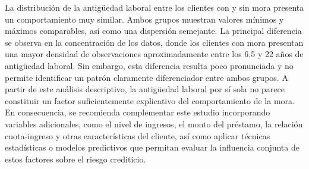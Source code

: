 La distribución de la antigüedad laboral entre los clientes con y sin mora presenta un comportamiento muy similar. Ambos grupos muestran valores mínimos y máximos comparables, así como una dispersión semejante. La principal diferencia se observa en la concentración de los datos, donde los clientes con mora presentan una mayor densidad de observaciones aproximadamente entre los
6.5 y 22 años
de antigüedad laboral. Sin embargo, esta diferencia resulta poco pronunciada y no permite identificar un patrón claramente diferenciador entre ambos grupos.
A partir de este análisis descriptivo, la antigüedad laboral por sí sola no parece constituir un factor suficientemente explicativo del comportamiento de la mora. En consecuencia, se recomienda complementar este estudio incorporando variables adicionales, como el nivel de ingresos, el monto del préstamo, la relación cuota-ingreso y otras características del cliente, así como aplicar técnicas estadísticas o modelos predictivos que permitan evaluar la influencia conjunta de estos factores sobre el riesgo crediticio.